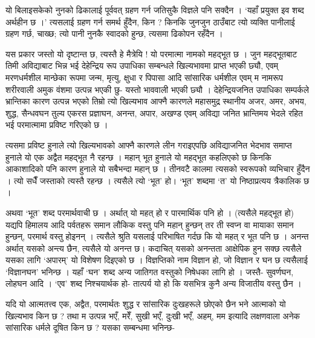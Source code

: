 \documentclass[11pt, a5paper]{article}
\begin{document}
यो बिलाइसकेको नुनको ढिकालाई पूर्ववत् ग्रहण गर्न जतिसुकै विज्ञले पनि सक्दैन । ‘यहाँ प्रयुक्त इव शब्द अर्थहीन छ ।’ त्यसलाई ग्रहण गर्न समर्थ हुँदैन, किन ? किनकि जुनजुन ठाउँबाट त्यो व्यक्ति पानीलाई ग्रहण गर्छ, चाख्छ; त्यो पानी नुनकै स्वादको हुन्छ, त्यसमा ढिकोपन रहँदैन ।

यस प्रकार जस्तो यो दृष्टान्त छ, त्यस्तै हे मैत्रेयि ! यो परमात्मा नामको महद्‍भूत छ । जुन महद्‍भूतबाट तिमी अविद्याबाट भिन्न भई देहेन्द्रिय रूप उपाधिका सम्बन्धले खिल्यभावमा प्राप्त भएकी छ्यौ, एवम् मरणधर्मशील मान्छेका रूपमा जन्म, मृत्यु, क्षुधा र पिपासा आदि सांसारिक धर्मशील एवम् म नामरूप शरीरवाली अमुक वंशमा उत्पन्न भएकी छु- यस्तो भाववाली भएकी छ्यौ । देहेन्द्रियजनित उपाधिका सम्पर्कले भ्रान्तिका कारण उत्पन्न भएको तिम्रो त्यो खिल्यभाव आफ्नै कारणले महासमुद्र स्थानीय अजर, अमर, अभय, शुद्ध, सैन्धवघन तुल्य एकरस प्रज्ञाघन, अनन्त, अपार, अखण्ड एवम् अविद्या जनित भ्रान्तिमय भेदले रहित भई परमात्मामा प्रविष्ट गरिएको छ ।

त्यसमा प्रविष्ट हुनाले त्यो खिल्यभावको आफ्नै कारणले लीन गराइएपछि अविद्याजनित भेदभाव समाप्त हुनाले यो एक अद्वैत महद्‍भूत नै रहन्छ । महान् भूत हुनाले यो महद्‍भूत कहलिएको छ किनकि आकाशादिको पनि कारण हुनाले यो सबैभन्दा महान् छ । तीनवटै कालमा त्यसको स्वरूपको व्यभिचार हुँदैन । त्यो सधैँ जस्ताको त्यस्तै रहन्छ । त्यसैले त्यो ‘भूत’ हो। ‘भूत’ शब्दमा ‘त’ यो निष्ठाप्रत्यय त्रैकालिक छ ।

अथवा ‘भूत’ शब्द  परमार्थवाची छ । अर्थात् यो महत् हो र पारमार्थिक पनि हो । (त्यसैले महद्भूत हो) यद्यपि हिमालय आदि पर्वतहरू समान लौकिक वस्तु पनि महान् हुन्छन् तर ती स्वप्न वा मायाका समान हुन्छन्, परमार्थ वस्तु होइनन् । त्यसैले श्रुति यसलाई परिभाषित गर्दछ कि यो महत् र भूत पनि छ । अनन्त अर्थात् यसको अन्त्य छैन, त्यसैले यो अनन्त छ। कदाचित् यसको अनन्तता आक्षेपिक हुन सक्छ त्यसैले यसका लागि ‘अपारम्’ यो विशेषण दिइएको छ । विज्ञप्तिको नाम विज्ञान हो, जो विज्ञान र घन छ त्यसैलाई ‘विज्ञानघन’ भनिन्छ । यहाँ ‘घन’ शब्द अन्य जातिगत वस्तुको निषेधका लागि हो । जस्तै- सुवर्णघन, लोहघन आदि । ‘एव’ शब्द निश्चयार्थक हो- तात्पर्य यो हो कि यसभित्र कुनै अन्य विजातीय वस्तु छैन ।

यदि यो आत्मतत्त्व एक, अद्वैत, परमार्थतः शुद्ध र सांसारिक दुःखहरूले छोएको छैन भने आत्माको यो खिल्यभाव किन छ ? तथा म उत्पन्न भएँ, मरेँ, सुखी भएँ, दुःखी भएँ, अहम्, मम इत्यादि लक्षणवाला अनेक सांसारिक धर्मले दूषित किन छ ? यसका सम्बन्धमा भनिन्छ-
\end{document}
